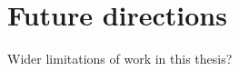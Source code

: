 

\section{Future directions}
\label{sec:17-futurework}

Wider limitations of work in this thesis?


